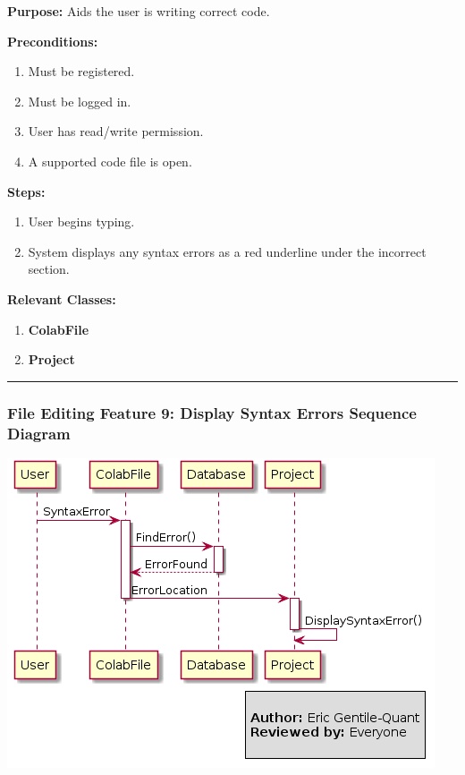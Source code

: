 \documentclass[twoside,letterpaper]{article}
\begin{document}
	\noindent\textbf{Purpose:} Aids the user is writing correct code. \newline
	
	\noindent\textbf{Preconditions:}
	\begin{enumerate}
		\item Must be registered.
		\item Must be logged in.
		\item User has read/write permission.
		\item A supported code file is open.
	\end{enumerate}
	\noindent\textbf{Steps:}
	\begin{enumerate}
		\item User begins typing.
		\item System displays any syntax errors as a red underline under the incorrect section.
	\end{enumerate}
	\noindent\textbf{Relevant Classes:}
	\begin{enumerate}
	    \item \textbf {ColabFile}
	    \item \textbf {Project}
	\end{enumerate}    
\vspace{8pt}
\hrule
\newpage

\subsubsection[File Editing Feature 9: Display Syntax Errors Sequence Diagram]{\rmfamily\bfseries\color{black}
	File Editing Feature 9: Display Syntax Errors Sequence Diagram}
\hypertarget{RefHeading22059017292}{}

\bigskip

\includegraphics[width=\textwidth]{images/SequenceDiagrams/SyntaxError}
\end{document}
